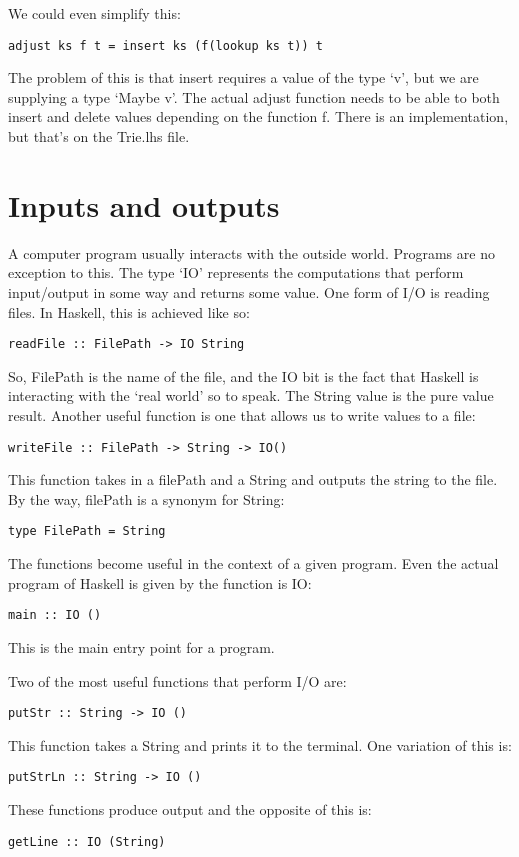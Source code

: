 \documentclass[11pt,a4paper,titlepage]{scrartcl}
\begin{document}
We could even simplify this:
\begin{lstlisting}
adjust ks f t = insert ks (f(lookup ks t)) t
\end{lstlisting}

The problem of this is that insert requires a value of the type `v', but
we are supplying a type `Maybe v'. The actual adjust function needs to be
able to both insert and delete values depending on the function f. There
is an implementation, but that's on the Trie.lhs file.

\section{Inputs and outputs}%
\label{sec:i/o}

A computer program usually interacts with the outside world. Programs are
no exception to this. The type `IO' represents the computations that
perform input/output in some way and returns some value. One form of I/O
is reading files. In Haskell, this is achieved like so:
\begin{lstlisting}
readFile :: FilePath -> IO String
\end{lstlisting}
So, FilePath is the name of the file, and the IO bit is the fact that
Haskell is interacting with the `real world' so to speak. The String value
is the pure value result.
Another useful function is one that allows us to write values to a file:
\begin{lstlisting}
writeFile :: FilePath -> String -> IO()
\end{lstlisting}

This function takes in a filePath and a String and outputs the string to
the file. By the way, filePath is a synonym for String:
\begin{lstlisting}
type FilePath = String
\end{lstlisting}

The functions become useful in the context of a given program. Even the
actual program of Haskell is given by the function is IO:
\begin{lstlisting}
main :: IO ()
\end{lstlisting}

This is the main entry point for a program.

Two of the most useful functions that perform I/O are:
\begin{lstlisting}
putStr :: String -> IO ()
\end{lstlisting}

This function takes a String and prints it to the terminal. One variation
of this is:
\begin{lstlisting}
putStrLn :: String -> IO ()
\end{lstlisting}
These functions produce output and the opposite of this is:
\begin{lstlisting}
getLine :: IO (String)
\end{lstlisting}
\end{document}
